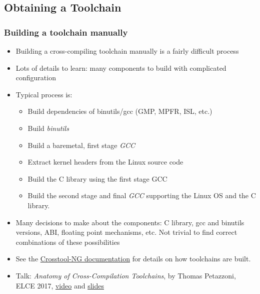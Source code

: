 \subsection{Obtaining a Toolchain}

\begin{frame}
  \frametitle{Building a toolchain manually}

  \begin{itemize}
  \item Building a cross-compiling toolchain manually is a fairly
    difficult process
  \item Lots of details to learn: many components to build with
    complicated configuration
  \item Typical process is:
    \begin{itemize}
    \item Build dependencies of binutils/gcc (GMP, MPFR, ISL, etc.)
    \item Build {\em binutils}
    \item Build a baremetal, first stage {\em GCC}
    \item Extract kernel headers from the Linux source code
    \item Build the C library using the first stage GCC
    \item Build the second stage and final {\em GCC} supporting the Linux
          OS and the C library.
    \end{itemize}
  \item Many decisions to make about the components: C library, gcc
    and binutils versions, ABI, floating point mechanisms, etc. Not
    trivial to find correct combinations of these possibilities
  \item See the
    \href{https://crosstool-ng.github.io/docs/toolchain-construction/}{Crosstool-NG
      documentation} for details on how toolchains are built.
  \item Talk: {\em Anatomy of Cross-Compilation Toolchains}, by Thomas
    Petazzoni, ELCE 2017, \href{https://youtu.be/Pbt330zuNPc}{video} and
    \href{https://elinux.org/images/1/15/Anatomy_of_Cross-Compilation_Toolchains.pdf}{slides}
\end{itemize}
\end{frame}

